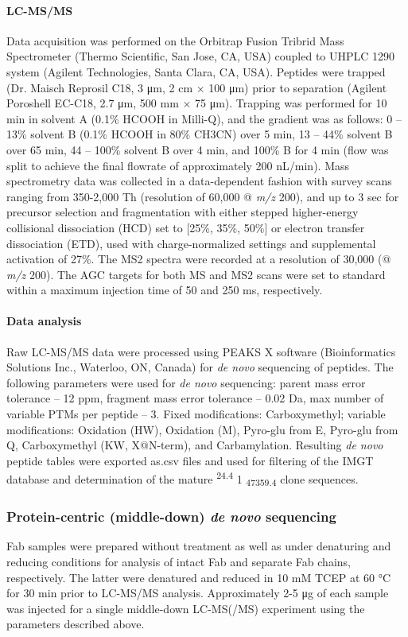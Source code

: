 \paragraph{LC-MS/MS}
Data acquisition was performed on the Orbitrap Fusion Tribrid Mass Spectrometer (Thermo Scientific, San Jose, CA, USA) coupled to UHPLC 1290 system (Agilent Technologies, Santa Clara, CA, USA). Peptides were trapped (Dr. Maisch Reprosil C18, 3 μm, 2 cm × 100 μm) prior to separation (Agilent Poroshell EC-C18, 2.7 μm, 500 mm × 75 μm). Trapping was performed for 10 min in solvent A (0.1\% HCOOH in Milli-Q), and the gradient was as follows: 0 – 13\% solvent B (0.1\% HCOOH in 80\% CH3CN) over 5 min, 13 – 44\% solvent B over 65 min, 44 – 100\% solvent B over 4 min, and 100\% B for 4 min (flow was split to achieve the final flowrate of approximately 200 nL/min). Mass spectrometry data was collected in a data-dependent fashion with survey scans ranging from 350-2,000 Th (resolution of 60,000 @ \emph{m/z} 200), and up to 3 sec for precursor selection and fragmentation with either stepped higher-energy collisional dissociation (HCD) set to [25\%, 35\%, 50\%] or electron transfer dissociation (ETD), used with charge-normalized settings and supplemental activation of 27\%. The MS2 spectra were recorded at a resolution of 30,000 (@ \emph{m/z} 200). The AGC targets for both MS and MS2 scans were set to standard within a maximum injection time of 50 and 250 ms, respectively.

\paragraph{Data analysis}
Raw LC-MS/MS data were processed using PEAKS X software (Bioinformatics Solutions Inc., Waterloo, ON, Canada) for \emph{de novo} sequencing of peptides. The following parameters were used for \emph{de novo} sequencing: parent mass error tolerance – 12 ppm, fragment mass error tolerance – 0.02 Da, max number of variable PTMs per peptide – 3. Fixed modifications: Carboxymethyl; variable modifications: Oxidation (HW), Oxidation (M), Pyro-glu from E, Pyro-glu from Q, Carboxymethyl (KW, X@N-term), and Carbamylation. Resulting \emph{de novo} peptide tables were exported as.csv files and used for filtering of the IMGT database and determination of the mature \textsuperscript{24.4} 1 \textsubscript{47359.4} clone sequences.

\subsubsection{Protein-centric (middle-down) \emph{de novo} sequencing}
Fab samples were prepared without treatment as well as under denaturing and reducing conditions for analysis of intact Fab and separate Fab chains, respectively. The latter were denatured and reduced in 10 mM TCEP at 60 °C for 30 min prior to LC-MS/MS analysis. Approximately 2-5 μg of each sample was injected for a single middle-down LC-MS(/MS) experiment using the parameters described above.

